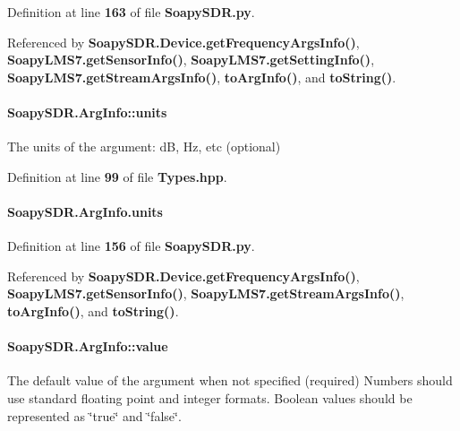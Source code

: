 Definition at line {\bf 163} of file {\bf Soapy\+S\+D\+R.\+py}.



Referenced by {\bf Soapy\+S\+D\+R.\+Device.\+get\+Frequency\+Args\+Info()}, {\bf Soapy\+L\+M\+S7.\+get\+Sensor\+Info()}, {\bf Soapy\+L\+M\+S7.\+get\+Setting\+Info()}, {\bf Soapy\+L\+M\+S7.\+get\+Stream\+Args\+Info()}, {\bf to\+Arg\+Info()}, and {\bf to\+String()}.

\paragraph[{units}]{ Soapy\+S\+D\+R.\+Arg\+Info\+::units}\label{classSoapySDR_1_1ArgInfo_a3e4f6d99594ec71c40a6ce15888fff32}


The units of the argument\+: dB, Hz, etc (optional) 



Definition at line {\bf 99} of file {\bf Types.\+hpp}.

\paragraph[{units}]{\setlength{\rightskip}{0pt plus 5cm}Soapy\+S\+D\+R.\+Arg\+Info.\+units\hspace{0.3cm}{\ttfamily [static]}}\label{classSoapySDR_1_1ArgInfo_a38d671c9d078ba3cf7cc4298a45583e4}


Definition at line {\bf 156} of file {\bf Soapy\+S\+D\+R.\+py}.



Referenced by {\bf Soapy\+S\+D\+R.\+Device.\+get\+Frequency\+Args\+Info()}, {\bf Soapy\+L\+M\+S7.\+get\+Sensor\+Info()}, {\bf Soapy\+L\+M\+S7.\+get\+Stream\+Args\+Info()}, {\bf to\+Arg\+Info()}, and {\bf to\+String()}.

\paragraph[{value}]{ Soapy\+S\+D\+R.\+Arg\+Info\+::value}\label{classSoapySDR_1_1ArgInfo_a996811cbb146325f5809b3dfd5da3d8e}
The default value of the argument when not specified (required) Numbers should use standard floating point and integer formats. Boolean values should be represented as \char`\"{}true\char`\"{} and \char`\"{}false\char`\"{}. 


